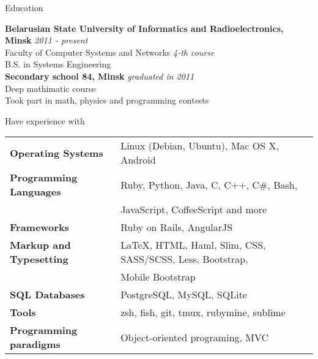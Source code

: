 \documentclass{resume} %
\begin{document}

\begin{rSection}{Education}

{\bf Belarusian State University of Informatics and Radioelectronics, Minsk} \hfill {\em  2011 - present} \\
Faculty of Computer Systems and Networks \hfill {\em  4-th course} \\
B.S. in Systems Engineering \\

{\bf Secondary school 84, Minsk} \hfill {\em  graduated in 2011} \\
Deep mathimatic course \\
Took part in math, physics and programming contests \\

\end{rSection}


\begin{rSection}{Have experience with}

\begin{tabular}{ @{} >{\bfseries}l @{\hspace{6ex}} l }
Operating Systems     & Linux (Debian, Ubuntu), Mac OS X, Android \\
Programming Languages & Ruby, Python, Java, C, C++, C\#, Bash, \\
                      & JavaScript, CoffeeScript and more\smallskip \\
Frameworks & Ruby on Rails, AngularJS\smallskip \\
Markup and Typesetting & \LaTeX, HTML, Haml, Slim, CSS, SASS/SCSS, Less, Bootstrap,\\
					   & Mobile Bootstrap\smallskip \\
SQL Databases & PostgreSQL, MySQL, SQLite \smallskip \\
Tools & zsh, fish, git, tmux, rubymine, sublime \smallskip \\
Programming paradigms & Object-oriented programing, MVC \\
\end{tabular}

\end{rSection}
\end{document}
